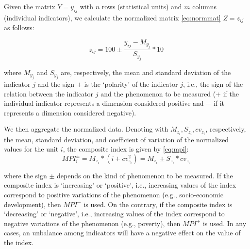 \documentclass[
]{svmono}
\begin{document}
Given the matrix \(Y=y_{ij}\) with \(n\) rows (statistical units) and \(m\)
columns (individual indicators), we calculate the normalized matrix \eqref{eq:normmat}
\(Z=z_{ij}\) as follows:

\begin{equation}
z_{ij}=100\pm\frac{y_{ij}-M_{y_j}}{S_{y_j}}*10
\label{eq:normmat}
\end{equation}

where \(M_{y_j}\) and \(S_{y_j}\) are, respectively, the mean and standard
deviation of the indicator \(j\) and the sign \(\pm\) is the `polarity' of
the indicator \(j\), i.e., the sign of the relation between the indicator
\(j\) and the phenomenon to be measured (\(+\) if the individual indicator
represents a dimension considered positive and \(-\) if it represents a
dimension considered negative).

We then aggregate the normalized data. Denoting with
\(M_{z_i},S_{z_i},cv_{z_i}\), respectively, the mean, standard deviation,
and coefficient of variation of the normalized values for the unit \(i\),
the composite index is given by \eqref{eq:mpi}:
\begin{equation}
MPI^\pm_i= M_{z_i}*(i+cv^2_{z_i})=M_{z_i}\pm S_{z_i}*cv_{z_i}
\label{eq:mpi}
\end{equation}

where the sign \(\pm\) depends on the kind of phenomenon to be
measured. If the composite index is `increasing' or `positive', i.e.,
increasing values of the index correspond to positive variations of the
phenomenon (e.g., socio-economic development), then \(MPI^-\) is used. On
the contrary, if the composite index is `decreasing' or `negative',
i.e., increasing values of the index correspond to negative variations
of the phenomenon (e.g., poverty), then \(MPI^+\) is used. In any cases,
an unbalance among indicators will have a negative effect on the value
of the index.
\end{document}
